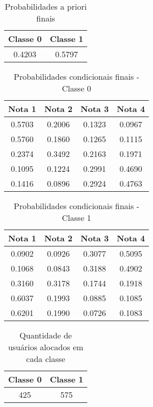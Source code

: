 \begin{enumerate}[label=(\alph*)]
\begin{table}[H]
    \centering
    \caption{Probabilidades a priori finais}
    \begin{tabular}{cc}
        \hline
        Classe 0 & Classe 1 \\
        \hline
        0.4203 & 0.5797 \\
        \hline
    \end{tabular}
    \label{tab:prob_priori}
\end{table}

\begin{table}[H]
    \centering
    \caption{Probabilidades condicionais finais - Classe 0}
    \begin{tabular}{cccc}
        \hline
        Nota 1 & Nota 2 & Nota 3 & Nota 4 \\
        \hline
        0.5703 & 0.2006 & 0.1323 & 0.0967 \\ 
        0.5760 & 0.1860 & 0.1265 & 0.1115 \\ 
        0.2374 & 0.3492 & 0.2163 & 0.1971 \\ 
        0.1095 & 0.1224 & 0.2991 & 0.4690 \\ 
        0.1416 & 0.0896 & 0.2924 & 0.4763 \\ 
        \hline
    \end{tabular}
    \label{tab:prob_cond_0}
\end{table}

\begin{table}[H]
    \centering
    \caption{Probabilidades condicionais finais - Classe 1}
    \begin{tabular}{cccc}
        \hline
        Nota 1 & Nota 2 & Nota 3 & Nota 4 \\
        \hline
        0.0902 & 0.0926 & 0.3077 & 0.5095 \\ 
        0.1068 & 0.0843 & 0.3188 & 0.4902 \\ 
        0.3160 & 0.3178 & 0.1744 & 0.1918 \\ 
        0.6037 & 0.1993 & 0.0885 & 0.1085 \\ 
        0.6201 & 0.1990 & 0.0726 & 0.1083 \\ 
        \hline
    \end{tabular}
    \label{tab:prob_cond_1}
\end{table}

\begin{table}[H]
    \centering
    \caption{Quantidade de usuários alocados em cada classe}
    \begin{tabular}{cc}
        \hline
        Classe 0 & Classe 1 \\
        \hline
        425 & 575 \\
        \hline
    \end{tabular}
    \label{tab:qtd_usuarios}
\end{table}



\end{enumerate}
